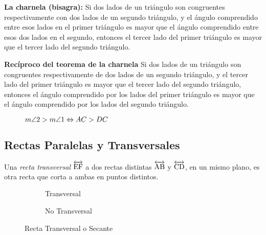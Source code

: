 \clearpage

\begin{theorem}{\textbf{La charnela (bisagra):}}
    Si dos lados de un triángulo son congruentes respectivamente con dos lados de un segundo triángulo, y el ángulo comprendido entre esos lados en el primer triángulo es mayor que el ángulo comprendido entre esos dos lados en el segundo, entonces el tercer lado del primer triángulo es mayor que el tercer lado del segundo triángulo.
\end{theorem}

\begin{theorem}{\textbf{Recíproco del teorema de la charnela}}
    Si dos lados de un triángulo son congruentes respectivamente de dos lados de un segundo triángulo, y el tercer lado del primer triángulo es mayor que el tercer lado del segundo triángulo, entonces el ángulo comprendido por los lados del primer triángulo es mayor que el ángulo comprendido por los lados del segundo triángulo.

    \begin{figure}[!h]
        \centering
        
        \caption{$m\angle{2} > m\angle{1} \Leftrightarrow AC > DC$}
        \label{fig:theorem5}
    \end{figure}
    
\end{theorem}

\subsection{Rectas Paralelas y Transversales}

\begin{definition}
    Una \textit{recta transversal} $\overleftrightarrow{\rm EF}$ a dos rectas distintas $\overleftrightarrow{\rm AB}$ y $\overleftrightarrow{\rm CD}$, en un mismo plano, es otra recta que corta a ambas en puntos distintos.


    \begin{figure}[h!]

        \centering

        \begin{subfigure}[b]{.5\textwidth}
            \centering
            
            \label{fig:transversal}
            \caption{Transversal}
        \end{subfigure}%
        \begin{subfigure}[b]{.5\textwidth}
            \centering
            
            \label{fig:not-transversal}
            \caption{No Transversal}
        \end{subfigure}

        \centering
        \caption{Recta Transversal o Secante}
        \label{fig:transversal-line}
        
    \end{figure}        
    
\end{definition}

